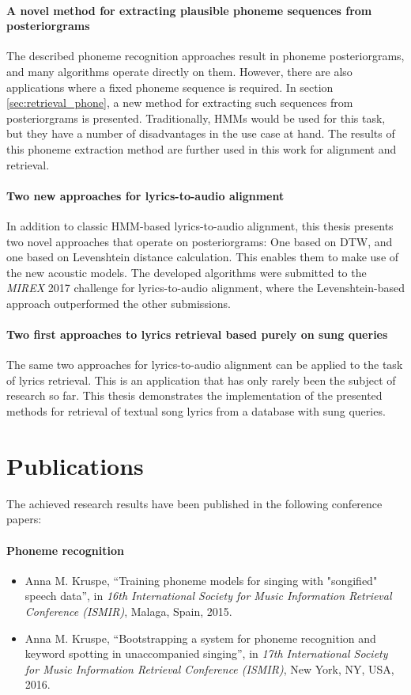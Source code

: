 \paragraph{A novel method for extracting plausible phoneme sequences from posteriorgrams}
The described phoneme recognition approaches result in phoneme posteriorgrams, and many algorithms operate directly on them. However, there are also applications where a fixed phoneme sequence is required. In section \ref{sec:retrieval_phone}, a new method for extracting such sequences from posteriorgrams is presented. Traditionally, HMMs would be used for this task, but they have a number of disadvantages in the use case at hand. The results of this phoneme extraction method are further used in this work for alignment and retrieval.

\paragraph{Two new approaches for lyrics-to-audio alignment}
In addition to classic HMM-based lyrics-to-audio alignment, this thesis presents two novel approaches that operate on posteriorgrams: One based on DTW, and one based on Levenshtein distance calculation. This enables them to make use of the new acoustic models. The developed algorithms were submitted to the \textit{MIREX} 2017 challenge for lyrics-to-audio alignment, where the Levenshtein-based approach outperformed the other submissions.

\paragraph{Two first approaches to lyrics retrieval based purely on sung queries}
The same two approaches for lyrics-to-audio alignment can be applied to the task of lyrics retrieval. This is an application that has only rarely been the subject of research so far. This thesis demonstrates the implementation of the presented methods for retrieval of textual song lyrics from a database with sung queries.

\section{Publications}
The achieved research results have been published in the following conference papers:

\paragraph{Phoneme recognition}
\begin{itemize}
\item Anna M. Kruspe, ``Training phoneme models for singing with "songified" speech data'', in \textit{16th International Society for Music Information Retrieval Conference (ISMIR)}, Malaga, Spain, 2015.
\item Anna M. Kruspe, ``Bootstrapping a system for phoneme recognition and keyword spotting in unaccompanied singing'', in \textit{17th International Society for Music Information Retrieval Conference (ISMIR)}, New York, NY, USA, 2016.
\end{itemize}

